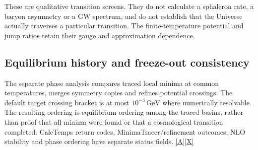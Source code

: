 \documentclass[11pt,a4paper]{article}
\newcommand{\src}[1]{\hyperlink{src:#1}{\textsf{[#1]}}}
\newcommand{\GeV}{\,\mathrm{GeV}}
\begin{document}
These are qualitative transition screens. They do not calculate a
sphaleron rate, a baryon asymmetry or a GW spectrum, and do not establish
that the Universe actually traverses a particular transition. The
finite-temperature potential and jump ratios retain their gauge and
approximation dependence.

\subsection{Equilibrium history and freeze-out consistency}
The separate phase analysis compares traced local minima at common
temperatures, merges symmetry copies and refines potential crossings.
The default target crossing bracket is at most $10^{-3}\GeV$ where
numerically resolvable. The resulting ordering is equilibrium ordering
among the traced basins, rather than proof that all minima were found or
that a cosmological transition completed. CalcTemps return codes,
MinimaTracer/refinement outcomes, NLO stability and phase ordering have
separate status fields. \src{A}\src{X}
\end{document}

